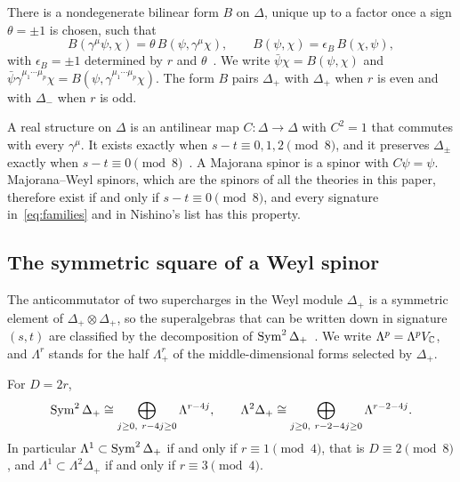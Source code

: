 There is a nondegenerate bilinear form $B$ on $\Delta$, unique up to a factor once a sign $\theta=\pm1$ is chosen, such that
\begin{equation}
\label{eq:Bsym}
B(\gamma^\mu\psi,\chi)=\theta\,B(\psi,\gamma^\mu\chi),\qquad B(\psi,\chi)=\epsilon_B\,B(\chi,\psi),
\end{equation}
with $\epsilon_B=\pm1$ determined by $r$ and $\theta$~\cite{Deligne1999,VanProeyen1999,DAuriaFerraraLledoVaradarajan2001}. We write $\bar\psi\chi=B(\psi,\chi)$ and $\bar\psi\gamma^{\mu_1\cdots\mu_p}\chi=B(\psi,\gamma^{\mu_1\cdots\mu_p}\chi)$. The form $B$ pairs $\Delta_+$ with $\Delta_+$ when $r$ is even and with $\Delta_-$ when $r$ is odd.

A real structure on $\Delta$ is an antilinear map $C:\Delta\to\Delta$ with $C^2=1$ that commutes with every $\gamma^\mu$. It exists exactly when $s-t\equiv0,1,2\pmod 8$, and it preserves $\Delta_\pm$ exactly when $s-t\equiv0\pmod 8$~\cite{LawsonMichelsohn1989,Deligne1999,VanProeyen1999}. A Majorana spinor is a spinor with $C\psi=\psi$. Majorana--Weyl spinors, which are the spinors of all the theories in this paper, therefore exist if and only if $s-t\equiv 0\pmod 8$, and every signature in~\eqref{eq:families} and in Nishino's list has this property.

\subsection{The symmetric square of a Weyl spinor}

The anticommutator of two supercharges in the Weyl module $\Delta_+$ is a symmetric element of $\Delta_+\otimes\Delta_+$, so the superalgebras that can be written down in signature $(s,t)$ are classified by the decomposition of $\operatorname{Sym}^2\Delta_+$~\cite{vanHoltenVanProeyen1982,DAuriaFerraraLledoVaradarajan2001}. We write $\Lambda^p=\Lambda^pV_{\mathbb{C}}$, and $\Lambda^r$ stands for the half $\Lambda^r_+$ of the middle-dimensional forms selected by $\Delta_+$.

\begin{proposition}
\label{prop:sym2}
For $D=2r$,
\begin{equation}
\label{eq:sym2}
\Sym^2\Delta_+\cong\bigoplus_{j\ge0,\ r-4j\ge0}\Lambda^{r-4j},\qquad \Lambda^2\Delta_+\cong\bigoplus_{j\ge0,\ r-2-4j\ge0}\Lambda^{r-2-4j}.
\end{equation}
In particular $\Lambda^1\subset\operatorname{Sym}^2\Delta_+$ if and only if $r\equiv1\pmod 4$, that is $D\equiv2\pmod 8$, and $\Lambda^1\subset\Lambda^2\Delta_+$ if and only if $r\equiv3\pmod 4$.
\end{proposition}

